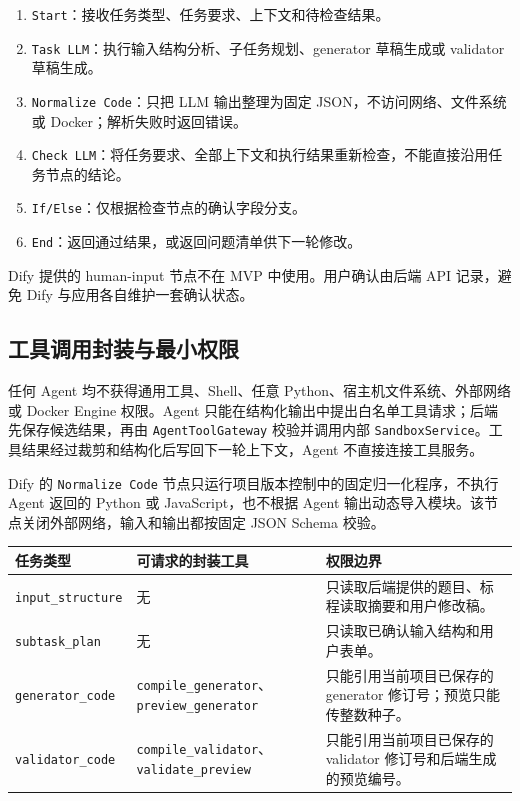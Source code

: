 \documentclass[UTF8,zihao=-4]{ctexart}
\begin{document}
\begin{enumerate}
  \item \texttt{Start}：接收任务类型、任务要求、上下文和待检查结果。
  \item \texttt{Task LLM}：执行输入结构分析、子任务规划、generator 草稿生成或 validator 草稿生成。
  \item \texttt{Normalize Code}：只把 LLM 输出整理为固定 JSON，不访问网络、文件系统或 Docker；解析失败时返回错误。
  \item \texttt{Check LLM}：将任务要求、全部上下文和执行结果重新检查，不能直接沿用任务节点的结论。
  \item \texttt{If/Else}：仅根据检查节点的确认字段分支。
  \item \texttt{End}：返回通过结果，或返回问题清单供下一轮修改。
\end{enumerate}

Dify 提供的 human-input 节点不在 MVP 中使用。用户确认由后端 API 记录，避免 Dify 与应用各自维护一套确认状态。

\subsection{工具调用封装与最小权限}

任何 Agent 均不获得通用工具、Shell、任意 Python、宿主机文件系统、外部网络或 Docker Engine 权限。Agent 只能在结构化输出中提出白名单工具请求；后端先保存候选结果，再由 \texttt{AgentToolGateway} 校验并调用内部 \texttt{SandboxService}。工具结果经过裁剪和结构化后写回下一轮上下文，Agent 不直接连接工具服务。

Dify 的 \texttt{Normalize Code} 节点只运行项目版本控制中的固定归一化程序，不执行 Agent 返回的 Python 或 JavaScript，也不根据 Agent 输出动态导入模块。该节点关闭外部网络，输入和输出都按固定 JSON Schema 校验。

\begin{longtable}{p{3.3cm}p{4.7cm}p{6.2cm}}
\toprule
任务类型 & 可请求的封装工具 & 权限边界 \\
\midrule
\footnotesize\texttt{input\_structure} & 无 & 只读取后端提供的题目、标程读取摘要和用户修改稿。 \\
\footnotesize\texttt{subtask\_plan} & 无 & 只读取已确认输入结构和用户表单。 \\
\footnotesize\texttt{generator\_code} & \texttt{compile\_generator}、\texttt{preview\_generator} & 只能引用当前项目已保存的 generator 修订号；预览只能传整数种子。 \\
\footnotesize\texttt{validator\_code} & \texttt{compile\_validator}、\texttt{validate\_preview} & 只能引用当前项目已保存的 validator 修订号和后端生成的预览编号。 \\
\bottomrule
\end{longtable}
\end{document}
